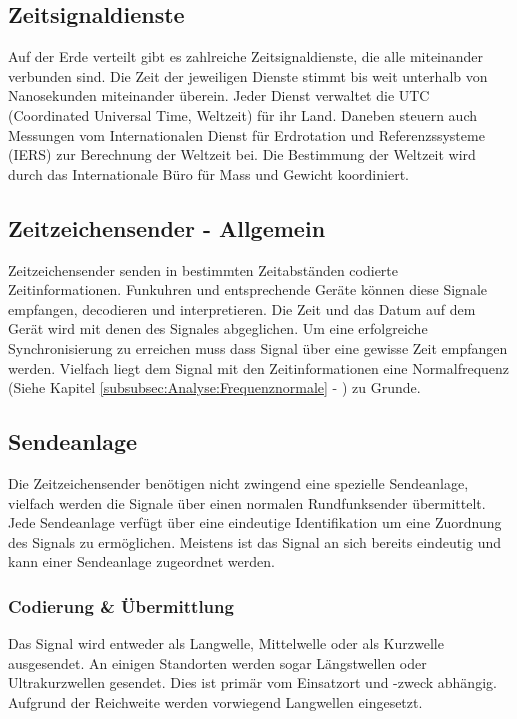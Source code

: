 \subsection{Zeitsignaldienste}
Auf der Erde verteilt gibt es zahlreiche Zeitsignaldienste, die alle miteinander verbunden sind. Die Zeit der jeweiligen Dienste stimmt bis weit unterhalb von Nanosekunden miteinander überein. Jeder Dienst verwaltet die UTC (Coordinated Universal Time, Weltzeit) für ihr Land. Daneben steuern auch Messungen vom Internationalen Dienst für Erdrotation und Referenzssysteme (IERS) zur Berechnung der Weltzeit bei.
Die Bestimmung der Weltzeit wird durch das Internationale Büro für Mass und Gewicht koordiniert. 

\subsection{Zeitzeichensender - Allgemein}

Zeitzeichensender senden in bestimmten Zeitabständen codierte Zeitinformationen. Funkuhren und entsprechende Geräte können diese Signale empfangen, decodieren und interpretieren. Die Zeit und das Datum auf dem Gerät wird mit denen des Signales abgeglichen. Um eine erfolgreiche Synchronisierung zu erreichen muss dass Signal über eine gewisse Zeit empfangen werden. Vielfach liegt dem Signal mit den Zeitinformationen eine Normalfrequenz (Siehe Kapitel \ref{subsubsec:Analyse:Frequenznormale} - ) zu Grunde.

\subsection{Sendeanlage}
Die Zeitzeichensender benötigen nicht zwingend eine spezielle Sendeanlage, vielfach werden die Signale über einen normalen Rundfunksender übermittelt. Jede Sendeanlage verfügt über eine eindeutige Identifikation um eine Zuordnung des Signals zu ermöglichen. Meistens ist das Signal an sich bereits eindeutig und kann einer Sendeanlage zugeordnet werden.

\subsubsection{Codierung \& Übermittlung}
Das Signal wird entweder als Langwelle, Mittelwelle oder als Kurzwelle ausgesendet. An einigen Standorten werden sogar Längstwellen oder Ultrakurzwellen gesendet. Dies ist primär vom Einsatzort und -zweck abhängig. Aufgrund der Reichweite werden vorwiegend Langwellen eingesetzt.

